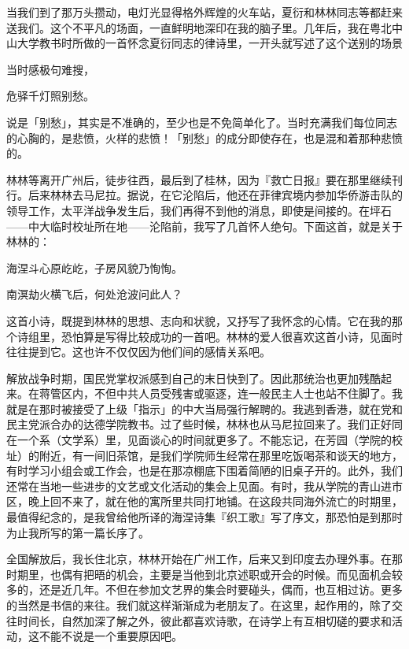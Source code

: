 {    当我们到了那万头攒动，电灯光显得格外辉煌的火车站，夏衍和林林同志等都赶来送我们。这个不平凡的场面，一直鲜明地深印在我的脑子里。几年后，我在粤北中山大学教书时所做的一首怀念夏衍同志的律诗里，一开头就写述了这个送别的场景
    \begin{center}
        当时感极句难搜，

        危驿千灯照别愁。
    \end{center}

    说是「别愁」，其实是不准确的，至少也是不免简单化了。当时充满我们每位同志的心胸的，是悲愤，火样的悲愤！「别愁」的成分即使存在，也是混和着那种悲愤的。

    林林等离开广州后，徒步往西，最后到了桂林，因为『救亡日报』要在那里继续刊行。后来林林去马尼拉。据说，在它沦陷后，他还在菲律宾境内参加华侨游击队的领导工作，太平洋战争发生后，我们再得不到他的消息，即使是间接的。在坪石——中大临时校址所在地——沦陷前，我写了几首怀人绝句。下面这首，就是关于林林的：
    \begin{center}
        海涅斗心原屹屹，子房风貌乃恂恂。

        南溟劫火横飞后，何处沧波问此人？
    \end{center}

    这首小诗，既提到林林的思想、志向和状貌，又抒写了我怀念的心情。它在我的那个诗组里，恐怕算是写得比较成功的一首吧。林林的爱人很喜欢这首小诗，见面时往往提到它。这也许不仅仅因为他们间的感情关系吧。

    解放战争时期，国民党掌权派感到自己的末日快到了。因此那统治也更加残酷起来。在蒋管区内，不但中共人员受残害或驱逐，连一般民主人士也站不住脚了。我就是在那时被接受了上级「指示」的中大当局强行解聘的。我逃到香港，就在党和民主党派合办的达德学院教书。过了些时候，林林也从马尼拉回来了。我们正好同在一个系（文学系）里，见面谈心的时间就更多了。不能忘记，在芳园（学院的校址）的附近，有一间旧茶馆，是我们学院师生经常在那里吃饭喝茶和谈天的地方，有时学习小组会或工作会，也是在那凉棚底下围着简陋的旧桌子开的。此外，我们还常在当地一些进步的文艺或文化活动的集会上见面。有时，我从学院的青山进市区，晚上回不来了，就在他的寓所里共同打地铺。在这段共同海外流亡的时期里，最值得纪念的，是我曾给他所译的海涅诗集『织工歌』写了序文，那恐怕是到那时为止我所写的第一篇长序了。

    全国解放后，我长住北京，林林开始在广州工作，后来又到印度去办理外事。在那时期里，也偶有把晤的机会，主要是当他到北京述职或开会的时候。而见面机会较多的，还是近几年。不但在参加文艺界的集会时要碰头，偶而，也互相过访。更多的当然是书信的来往。我们就这样渐渐成为老朋友了。在这里，起作用的，除了交往时间长，自然加深了解之外，彼此都喜欢诗歌，在诗学上有互相切磋的要求和活动，这不能不说是一个重要原因吧。

}
